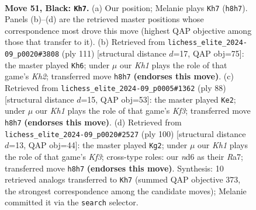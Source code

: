 \documentclass[11pt]{article}
\begin{document}
\clearpage

\begin{figure}[p]\centering
\begin{subfigure}{0.46\textwidth}\centering
\resizebox{\linewidth}{!}{%
\newchessgame
\chessboard[
  setfen={1R5k/6p1/3N1p2/5p1p/3P3P/4r1P1/6K1/8 b - - 1 51},
  showmover=false,
  pgfstyle=straightmove, color=movearrow, markmove={h8-h7}
]}
\caption{}
\end{subfigure}\hfill
\begin{subfigure}{0.46\textwidth}\centering
\resizebox{\linewidth}{!}{%
\newchessgame
\chessboard[
  setfen={8/1R5k/6p1/4pp1p/r6P/6P1/5K2/8 b - - 1 56},
  showmover=false,
  pgfstyle=straightmove, color=movearrow, markmove={h7-h6}
]}
\caption{}
\end{subfigure}
\\[4pt]
\begin{subfigure}{0.46\textwidth}\centering
\resizebox{\linewidth}{!}{%
\newchessgame
\chessboard[
  setfen={5k2/3R2p1/7p/4Pp1P/5P2/1r3K2/6P1/8 w - - 6 45},
  showmover=false,
  pgfstyle=straightmove, color=movearrow, markmove={f3-e2}
]}
\caption{}
\end{subfigure}\hfill
\begin{subfigure}{0.46\textwidth}\centering
\resizebox{\linewidth}{!}{%
\newchessgame
\chessboard[
  setfen={8/R7/6p1/p3k2p/P6P/1Pr2KP1/8/8 w - - 5 51},
  showmover=false,
  pgfstyle=straightmove, color=movearrow, markmove={f3-g2}
]}
\caption{}
\end{subfigure}
\caption{\textbf{Move 51, Black: \texttt{Kh7}.} (a) Our position; Melanie plays \texttt{Kh7} (\texttt{h8h7}). Panels (b)--(d) are the retrieved master positions whose correspondence most drove this move (highest QAP objective among those that transfer to it). (b) Retrieved from \texttt{lichess\_elite\_2024-09\_p0020\#3808} (ply 111) [structural distance $d$=17, QAP obj=75]: the master played \texttt{Kh6}; under $\mu$ our \emph{Kh1} plays the role of that game's \emph{Kh2}; transferred move \texttt{h8h7} \textbf{(endorses this move)}. (c) Retrieved from \texttt{lichess\_elite\_2024-09\_p0005\#1362} (ply 88) [structural distance $d$=15, QAP obj=53]: the master played \texttt{Ke2}; under $\mu$ our \emph{Kh1} plays the role of that game's \emph{Kf3}; transferred move \texttt{h8h7} \textbf{(endorses this move)}. (d) Retrieved from \texttt{lichess\_elite\_2024-09\_p0020\#2527} (ply 100) [structural distance $d$=13, QAP obj=44]: the master played \texttt{Kg2}; under $\mu$ our \emph{Kh1} plays the role of that game's \emph{Kf3}; cross-type roles: our \emph{n}d6 as their \emph{R}a7; transferred move \texttt{h8h7} \textbf{(endorses this move)}. Synthesis: 10 retrieved analogs transferred to \texttt{Kh7} (summed QAP objective 373, the strongest correspondence among the candidate moves); Melanie committed it via the \texttt{search} selector.}
\label{fig:thought-m101}
\end{figure}
\end{document}
